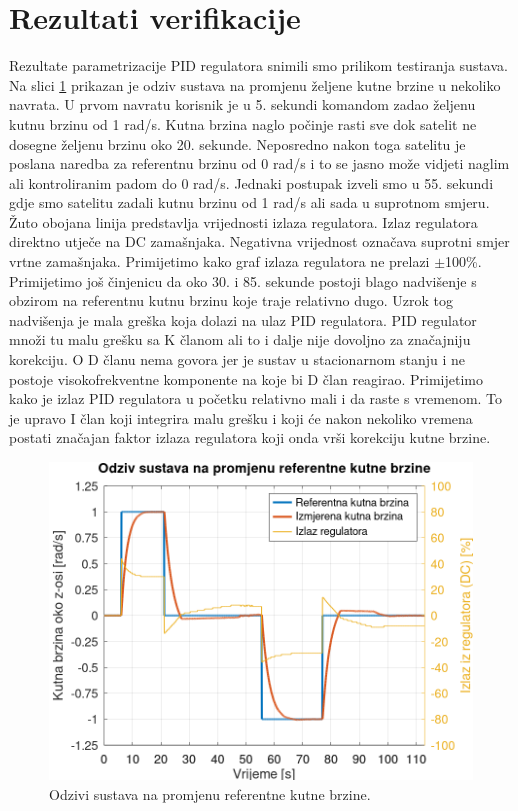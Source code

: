 \documentclass[times, utf8, diplomski, numeric]{templates/template}
\begin{document}
{    \section{Rezultati verifikacije}{
        Rezultate parametrizacije PID regulatora snimili smo prilikom testiranja sustava. Na slici \ref{fig:ang_vel_reg_user} prikazan je odziv sustava na promjenu željene kutne brzine u nekoliko navrata. U prvom navratu korisnik je u 5. sekundi komandom zadao željenu kutnu brzinu od 1 rad/s. Kutna brzina naglo počinje rasti sve dok satelit ne dosegne željenu brzinu oko 20. sekunde. Neposredno nakon toga satelitu je poslana naredba za referentnu brzinu od 0 rad/s i to se jasno može vidjeti naglim ali kontroliranim padom do 0 rad/s. Jednaki postupak izveli smo u 55. sekundi gdje smo satelitu zadali kutnu brzinu od 1 rad/s ali sada u suprotnom smjeru. Žuto obojana linija predstavlja vrijednosti izlaza regulatora. Izlaz regulatora direktno utječe na DC zamašnjaka. Negativna vrijednost označava suprotni smjer vrtne zamašnjaka. Primijetimo kako graf izlaza regulatora ne prelazi $\pm$100\%. Primijetimo još činjenicu da oko 30. i 85. sekunde postoji blago nadvišenje s obzirom na referentnu kutnu brzinu koje traje relativno dugo. Uzrok tog nadvišenja je mala greška koja dolazi na ulaz PID regulatora. PID regulator množi tu malu grešku sa K članom ali to i dalje nije dovoljno za značajniju korekciju. O D članu nema govora jer je sustav u stacionarnom stanju i ne postoje visokofrekventne komponente na koje bi D član reagirao. Primijetimo kako je izlaz PID regulatora u početku relativno mali i da raste s vremenom. To je upravo I član koji integrira malu grešku i koji će nakon nekoliko vremena postati značajan faktor izlaza regulatora koji onda vrši korekciju kutne brzine. 

        \begin{figure}[htb]
        \centering
        \includegraphics[width=1.0\textwidth]{other/ang_vel_reg_user.png}
        \caption{Odzivi sustava na promjenu referentne kutne brzine.}
        \label{fig:ang_vel_reg_user}
        \end{figure}

}}
\end{document}
